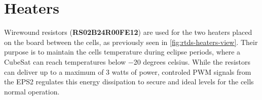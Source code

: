 \section{Heaters}

Wirewound resistors (\textbf{RS02B24R00FE12}) are used for the two heaters placed on the board between the cells, as previously seen in \autoref{fig:rtds-heaters-view}. Their purpose is to maintain the cells temperature during eclipse periods, where a CubeSat can reach temperatures below $-$20 degrees celsius. While the resistors can deliver up to a maximum of 3 watts of power, controled PWM signals from the EPS2 regulates this energy dissipation to secure and ideal levels for the cells normal operation.